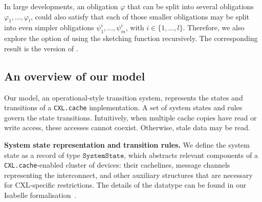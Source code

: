 \documentclass[10pt,conference]{IEEEtran}
\newcommand\CXLcache{\texttt{CXL.cache}}
\begin{document}
In large developments, an obligation $\varphi$ that can be split into several obligations $\varphi_1,\dots,\varphi_l$, could also satisfy that each of those smaller obligations may be split into even simpler obligations $\psi^i_1,\dots,\psi^i_m$, with $i\in\{1,\dots,l\}$. Therefore, we also explore the option of using the sketching \frameterm function recursively. The corresponding result is the \doublesketch{} version of \supersketch{}.

\subsection{}
\subsection{An overview of our model}\label{sec:modeloverview}
\newcommand{\SystemState}{\texttt{SystemState}}


Our model, an operational-style transition system, represents the states and transitions of a \CXLcache{} implementation. A set of system states and rules govern the state transitions.
Intuitively, when multiple cache copies have read or write access, these accesses cannot coexist. Otherwise, stale data may be read.

\smallskip\noindent
\textbf{System state representation and transition rules.}
We define the system state as a record of type $\SystemState$, which abstracts relevant components of a \CXLcache{}-enabled cluster of devices: their cachelines, message channels representing the interconnect, and other auxiliary
structures that are necessary for CXL-specific restrictions. The details of the datatype can be found in our Isabelle formalisation~\cite{FormaliSERepo}. 
\end{document}
